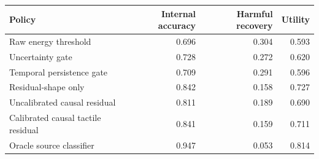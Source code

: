 \begin{tabular}{lrrr}
\toprule
Policy & Internal accuracy & Harmful recovery & Utility \\
\midrule
Raw energy threshold & 0.696 & 0.304 & 0.593 \\
Uncertainty gate & 0.728 & 0.272 & 0.620 \\
Temporal persistence gate & 0.709 & 0.291 & 0.596 \\
Residual-shape only & 0.842 & 0.158 & 0.727 \\
Uncalibrated causal residual & 0.811 & 0.189 & 0.690 \\
Calibrated causal tactile residual & 0.841 & 0.159 & 0.711 \\
Oracle source classifier & 0.947 & 0.053 & 0.814 \\
\bottomrule
\end{tabular}
